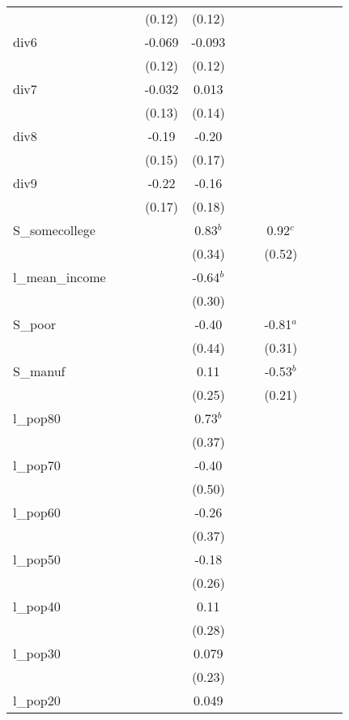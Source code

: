 \documentclass[]{article}
\begin{document}
\begin{tabular}{lcccccccccc}
 &  &  & (0.12) & (0.12) &  &  &  &  &  &  \\
div6 &  &  & -0.069 & -0.093 &  &  &  &  &  &  \\
 &  &  & (0.12) & (0.12) &  &  &  &  &  &  \\
div7 &  &  & -0.032 & 0.013 &  &  &  &  &  &  \\
 &  &  & (0.13) & (0.14) &  &  &  &  &  &  \\
div8 &  &  & -0.19 & -0.20 &  &  &  &  &  &  \\
 &  &  & (0.15) & (0.17) &  &  &  &  &  &  \\
div9 &  &  & -0.22 & -0.16 &  &  &  &  &  &  \\
 &  &  & (0.17) & (0.18) &  &  &  &  &  &  \\
S\_somecollege &  &  &  & 0.83$^b$ &  &  & 0.92$^c$ &  &  &  \\
 &  &  &  & (0.34) &  &  & (0.52) &  &  &  \\
l\_mean\_income &  &  &  & -0.64$^b$ &  &  &  &  &  &  \\
 &  &  &  & (0.30) &  &  &  &  &  &  \\
S\_poor &  &  &  & -0.40 &  &  & -0.81$^a$ &  &  &  \\
 &  &  &  & (0.44) &  &  & (0.31) &  &  &  \\
S\_manuf &  &  &  & 0.11 &  &  & -0.53$^b$ &  &  &  \\
 &  &  &  & (0.25) &  &  & (0.21) &  &  &  \\
l\_pop80 &  &  &  & 0.73$^b$ &  &  &  &  &  &  \\
 &  &  &  & (0.37) &  &  &  &  &  &  \\
l\_pop70 &  &  &  & -0.40 &  &  &  &  &  &  \\
 &  &  &  & (0.50) &  &  &  &  &  &  \\
l\_pop60 &  &  &  & -0.26 &  &  &  &  &  &  \\
 &  &  &  & (0.37) &  &  &  &  &  &  \\
l\_pop50 &  &  &  & -0.18 &  &  &  &  &  &  \\
 &  &  &  & (0.26) &  &  &  &  &  &  \\
l\_pop40 &  &  &  & 0.11 &  &  &  &  &  &  \\
 &  &  &  & (0.28) &  &  &  &  &  &  \\
l\_pop30 &  &  &  & 0.079 &  &  &  &  &  &  \\
 &  &  &  & (0.23) &  &  &  &  &  &  \\
l\_pop20 &  &  &  & 0.049 &  &  &  &  &  &  \\

\end{tabular}
\end{document}
